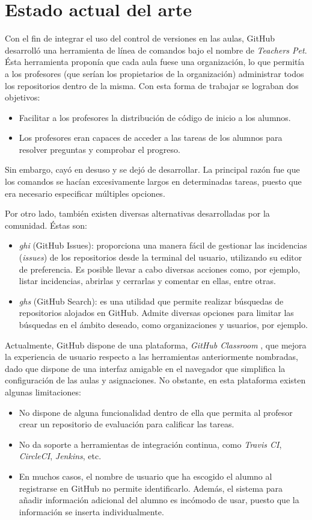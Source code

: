 \section{Estado actual del arte}
\label{1:sec:2}
Con el fin de integrar el uso del control de versiones en las aulas, GitHub desarrolló una herramienta de línea de comandos bajo el nombre de {\it Teachers Pet}. Ésta herramienta proponía que cada aula fuese una
organización, lo que permitía a los profesores (que serían los propietarios de la organización) administrar todos los repositorios dentro de la misma. Con esta forma de trabajar se lograban dos objetivos:
\begin{itemize}
  \item Facilitar a los profesores la distribución de código de inicio a los alumnos.
  \item Los profesores eran capaces de acceder a las tareas de los alumnos para resolver preguntas y comprobar el progreso.
\end{itemize}
Sin embargo, cayó en desuso y se dejó de desarrollar. La principal razón fue que los comandos se hacían excesivamente largos en determinadas tareas, puesto que era necesario especificar múltiples opciones.
\bigskip

Por otro lado, también existen diversas alternativas desarrolladas por la comunidad. Éstas son:
\begin{itemize}
  \item {\it ghi} \cite{B1} (GitHub Issues): proporciona una manera fácil de gestionar las incidencias ({\it issues}) de los repositorios desde la terminal del usuario, utilizando su editor de preferencia. Es posible llevar a cabo diversas acciones como, por ejemplo,
  listar incidencias, abrirlas y cerrarlas y comentar en ellas, entre otras.
  \item {\it ghs} \cite{B2} (GitHub Search): es una utilidad que permite realizar búsquedas de repositorios alojados en GitHub. Admite diversas opciones para limitar las búsquedas en el ámbito deseado, como organizaciones y usuarios, por ejemplo.
\end{itemize}

Actualmente, GitHub dispone de una plataforma, {\it GitHub Classroom} \cite{B3}, que mejora la experiencia de usuario respecto a las herramientas anteriormente nombradas, dado que dispone de una interfaz amigable en el navegador que simplifica
la configuración de las aulas y asignaciones. No obstante, en esta plataforma existen algunas limitaciones:
\begin{itemize}
  \item No dispone de alguna funcionalidad dentro de ella que permita al profesor crear un repositorio de evaluación para calificar las tareas.
  \item No da soporte a herramientas de integración continua, como {\it Travis CI}, {\it CircleCI}, {\it Jenkins}, etc.
  \item En muchos casos, el nombre de usuario que ha escogido el alumno al registrarse en GitHub no permite identificarlo. Además, el sistema para añadir información adicional del alumno es incómodo de usar,
  puesto que la información se inserta individualmente.
\end{itemize}
